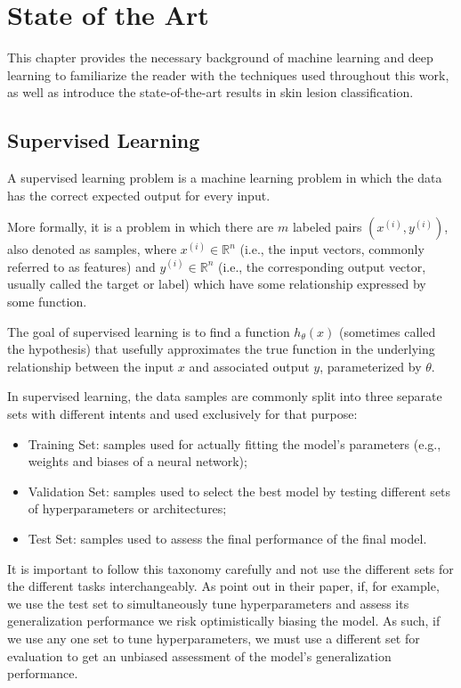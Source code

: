 \chapter{State of the Art}
\label{chapter:sota}

This chapter provides the necessary background of machine learning and deep learning to familiarize the reader with the techniques used throughout this work, as well as introduce the state-of-the-art results in skin lesion classification.

\section{Supervised Learning}

A supervised learning problem is a machine learning problem in which the data has the correct expected output for every input.

More formally, it is a problem in which there are $m$ labeled pairs $(x^{(i)}, y^{(i)})$, also denoted as samples, where $x^{(i)} \in \mathbb{R}^n$ (i.e., the input vectors, commonly referred to as features) and $y^{(i)} \in \mathbb{R}^n$ (i.e., the corresponding output vector, usually called the target or label) which have some relationship expressed by some function.

The goal of supervised learning is to find a function $h_{\theta}(x)$ (sometimes called the hypothesis) that usefully approximates the true function in the underlying relationship between the input $x$ and associated output $y$, parameterized by $\theta$.

In supervised learning, the data samples are commonly split into three separate sets with different intents and used exclusively for that purpose:

\begin{itemize}
    \item Training Set: samples used for actually fitting the model's parameters (e.g., weights and biases of a neural network);
    \item Validation Set: samples used to select the best model by testing different sets of hyperparameters or architectures;
    \item Test Set: samples used to assess the final performance of the final model.
\end{itemize}

It is important to follow this taxonomy carefully and not use the different sets for the different tasks interchangeably. As \citeauthor{crossvalidationbias} point out in their \citeyear{crossvalidationbias} paper, if, for example, we use the test set to simultaneously tune hyperparameters and assess its generalization performance we risk optimistically biasing the model. As such, if we use any one set to tune hyperparameters, we must use a different set for evaluation to get an unbiased assessment of the model's generalization performance.

